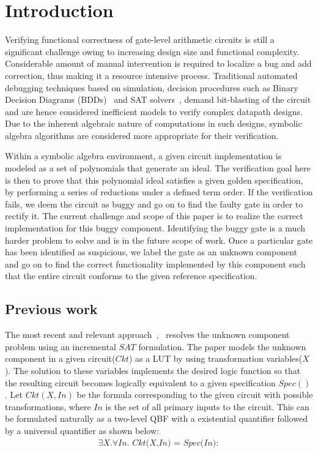 \section{Introduction}
Verifying functional correctness of gate-level arithmetic circuits is still a significant challenge owing to increasing design size and functional complexity. Considerable amount of manual intervention is required to localize a bug and add correction, thus making it a resource intensive process. Traditional automated debugging techniques based on simulation, decision procedures such as Binary Decision Diagrams (BDDs)~\cite{bryant:1} and SAT solvers~\cite{alanmi:2006}, demand bit-blasting of the circuit and are hence considered inefficient models to verify complex datapath designs. Due to the inherent algebraic nature of computations in such designs, symbolic algebra algorithms are considered more appropriate for their verification.

Within a symbolic algebra environment, a given circuit implementation is modeled as a set of polynomials that generate an ideal. The verification goal here is then to prove that this polynomial ideal satisfies a given golden specification, by performing a series of reductions under a defined term order. If the verification fails, we deem the circuit as buggy and go on to find the faulty gate in order to rectify it. The current challenge and scope of this paper is to realize the correct implementation for this buggy component. Identifying the buggy gate is a much harder problem to solve and is in the future scope of work. Once a particular gate has been identified as suspicious, we label the gate as an unknown component and go on to find the correct functionality implemented by this component such that the entire circuit conforms to the given reference specification.
\vspace{-0.1in}
\subsection{Previous work}

The most recent and relevant approach~\cite{fujita:2015},~\cite{fujita:2012} resolves the unknown component problem using an incremental $SAT$ formulation. The paper models the unknown component in a given circuit($Ckt$) as a LUT by using transformation variables($X$). The solution to these variables implements the desired logic function so that the resulting circuit becomes logically equivalent to a given specification $Spec()$. Let $Ckt(X,In)$ be the formula corresponding to the given circuit with possible transformations, where $In$ is the set of all primary inputs to the circuit. This can be formulated naturally as a two-level QBF with a existential quantifier followed by a universal quantifier as shown below:
\vspace{0.1in}
\begin{align}
\exists \textit{X}.\forall \textit{In. Ckt(X,In) = Spec(In)}:    
\end{align}

